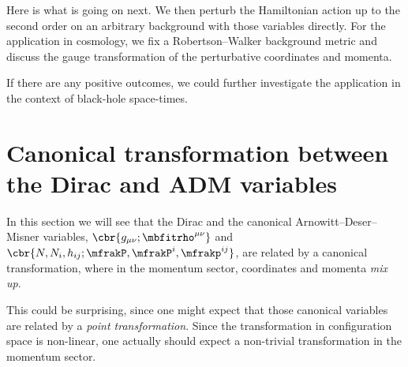 \documentclass[a4paper,11pt]{article}
\begin{document}
Here is what is going on next. We then perturb the Hamiltonian action up to the 
second order on an arbitrary background with those variables directly. For the 
application in cosmology, we fix a Robertson--Walker background metric and 
discuss the gauge transformation of the perturbative coordinates and momenta.

If there are any positive outcomes, we could further investigate the 
application in the context of black-hole space-times.


\section{Canonical transformation between the Dirac and ADM variables}
\label{sec:Dirac-ADM-canonical}

In this section we will see that the Dirac and the canonical 
Arnowitt--Deser--Misner  variables, $\cbr{g_{\mu\nu}; \mbfitrho^{\mu\nu}}$ and 
$\cbr{N, N_i, h_{ij}; \mfrakP, \mfrakP^i, \mfrakp^{ij}}$, are related by a 
canonical transformation, where in the momentum sector, coordinates and momenta 
\emph{mix up}.

This could be surprising, since one might expect that those canonical 
variables are related by a \emph{point transformation}. Since the 
transformation in configuration space is non-linear, one actually should expect 
a non-trivial transformation in the momentum sector.
\end{document}
